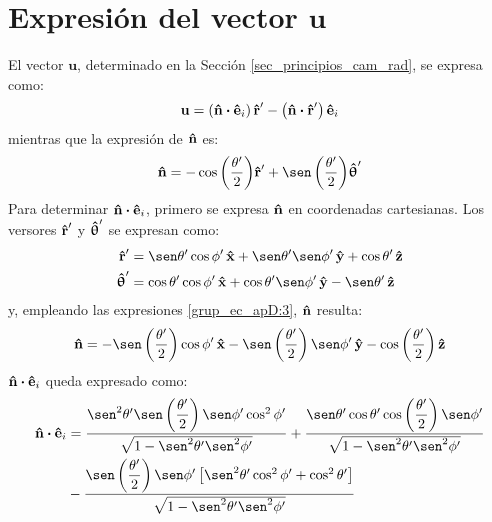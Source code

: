 \section{Expresión del vector \texorpdfstring{$\mathbf{u}$}{text}}

El vector $\mathbf{u}$, determinado en la Sección \ref{sec_principios_cam_rad}, se expresa como:
\begin{align}
\mathbf{u} = \left(\bm{\mathbf{\hat{n}}}\boldsymbol{\cdot}\bm{\mathbf{\hat{e}}}_i\right)\bm{\mathbf{\hat{r}}}' - \left(\bm{\mathbf{\hat{n}}}\boldsymbol{\cdot}\bm{\mathbf{\hat{r}}}'\right)\bm{\mathbf{\hat{e}}}_i
\label{ec_apD:25}
\end{align}
mientras que la expresión de $\bm{\mathbf{\hat{n}}}$ es:
\begin{align}
\versor{n} = -\cos\left(\frac{\theta '}{2}\right)\!\versor{r}' + \sen\left(\frac{\theta '}{2}\right)\!\versor{\uptheta}'
\label{ec_apD:26}
\end{align}
Para determinar $\bm{\mathbf{\hat{n}}}\boldsymbol{\cdot}\bm{\mathbf{\hat{e}}}_i$, primero se expresa $\bm{\mathbf{\hat{n}}}$ en coordenadas cartesianas. Los versores $\bm{\mathbf{\hat{r}}}'$ y $\bm{\mathbf{\hat{\uptheta}}}'$ se expresan como:
\begin{subequations}
\label{grup_ec_apD:3}
\begin{align}
\versor{r}' &= \sen\theta '\cos\phi '\,\versor{x} + \sen\theta '\sen\phi '\,\versor{y} + \cos\theta '\,\versor{z}
\label{ec_apD:27}\\
\versor{\uptheta}' &= \cos\theta '\cos\phi '\,\versor{x} + \cos\theta '\sen\phi '\,\versor{y} - \sen\theta '\,\versor{z}
\label{ec_apD:28}
\end{align}
\end{subequations}
y, empleando las expresiones \eqref{grup_ec_apD:3}, $\bm{\mathbf{\hat{n}}}$ resulta:
\begin{align}
\versor{n} = - \sen\left(\dfrac{\theta '}{2}\right)\cos\phi '\,\versor{x} - \sen\left(\dfrac{\theta '}{2}\right)\sen\phi '\,\versor{y} - \cos\left(\dfrac{\theta '}{2}\right)\versor{z}
\label{ec_apD:29}
\end{align}
$\bm{\mathbf{\hat{n}}}\boldsymbol{\cdot}\bm{\mathbf{\hat{e}}}_i$ queda expresado como:
\begin{align}
\begin{split}
\versor{n}\prodesc\versor{e}_i &= \dfrac{\sen^2\theta '\sen\left(\dfrac{\theta '}{2}\right)\sen\phi '\cos^2\phi '}{\sqrt{1 - \sen^2\theta '\sen^2\phi '}} + \dfrac{\sen\theta '\cos\theta '\cos\left(\dfrac{\theta '}{2}\right)\sen\phi '}{\sqrt{1 - \sen^2\theta '\sen^2\phi '}}\\
&- \dfrac{\sen\left(\dfrac{\theta '}{2}\right)\sen\phi '\left[\sen^2\theta '\cos^2\phi ' + \cos^2\theta '\right]}{\sqrt{1 - \sen^2\theta '\sen^2\phi '}}
\end{split}
\label{ec_apD:30}
\end{align}
